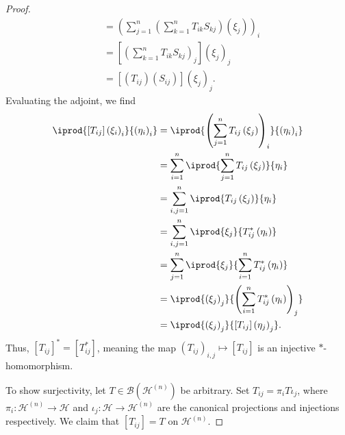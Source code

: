 \documentclass[10pt]{mypackage}
\begin{document}
\begin{proof}
\begin{align*}
                                                                       &= \left(\sum_{j=1}^{n}\left(\sum_{k=1}^{n}T_{ik}S_{kj}\right)\left(\xi_j\right)\right)_{i}\\
                                                                       &= \left[\left(\sum_{k=1}^{n}T_{ik}S_{kj}\right)_{j}\right]\left(\xi_j\right)_j\\
                                                                       &= \left[\left(T_{ij}\right)\left(S_{ij}\right)\right]\left(\xi_j\right)_j.
  \end{align*}
  Evaluating the adjoint, we find
  \begin{align*}
    \iprod{\left[T_{ij}\right]\left(\xi_i\right)_i}{\left(\eta_i\right)_i} &= \iprod{\left(\sum_{j=1}^{n}T_{ij}\left(\xi_j\right)\right)_i}{\left(\eta_i\right)_i}\\
                                                                           &= \sum_{i=1}^n \iprod{\sum_{j=1}^{n}T_{ij}\left(\xi_j\right)}{\eta_i}\\
                                                                           &= \sum_{i,j=1}^{n} \iprod{T_{ij}\left(\xi_j\right)}{\eta_i}\\
                                                                           &= \sum_{i,j=1}^{n} \iprod{\xi_j}{T_{ij}^{\ast}\left(\eta_i\right)}\\
                                                                           &= \sum_{j=1}^{n} \iprod{\xi_j}{\sum_{i=1}^{n}T_{ij}^{\ast}\left(\eta_i\right)}\\
                                                                           &= \iprod{\left(\xi_j\right)_j}{\left(\sum_{i=1}^{n}T_{ij}^{\ast}\left(\eta_i\right)\right)_{j}}\\
                                                                           &= \iprod{\left(\xi_j\right)_j}{\left[T_{ij}\right]\left(\eta_j\right)_j}.
  \end{align*}
  Thus, $\left[T_{ij}\right]^{\ast} = \left[T_{ij}^{\ast}\right]$, meaning the map $\left(T_{ij}\right)_{i,j}\mapsto \left[T_{ij}\right]$ is an injective $\ast$-homomorphism.\newline

  To show surjectivity, let $T\in \mathcal{B}\left(\mathcal{H}^{(n)}\right)$ be arbitrary. Set $T_{ij} = \pi_iT\iota_j$, where $\pi_i\colon \mathcal{H}^{(n)}\rightarrow \mathcal{H}$ and $\iota_j\colon \mathcal{H}\rightarrow \mathcal{H}^{(n)}$ are the canonical projections and injections respectively. We claim that $\left[T_{ij}\right] = T$ on $\mathcal{H}^{(n)}$.\newline


\end{proof}
\end{document}
